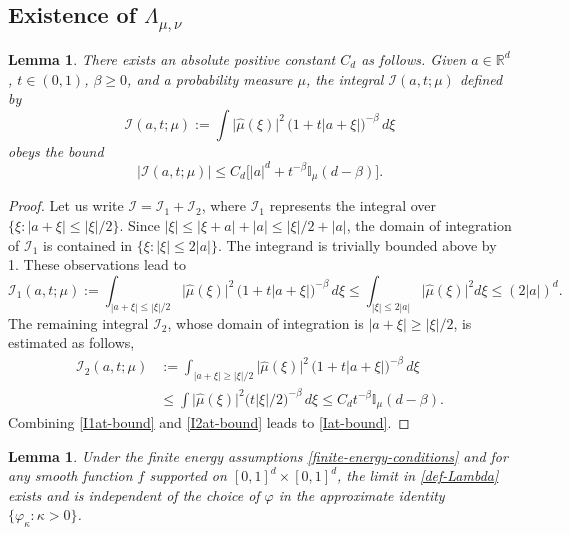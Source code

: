 \documentclass[a4paper,11pt]{amsart}
\newtheorem{lem}[thm]{\bf Lemma}
\numberwithin{equation}{section}
\begin{document}
\subsection{Existence of $\Lambda_{\mu, \nu}$} 
\begin{lem} \label{Iatmu-lemma}
There exists an absolute positive constant $C_d$ as follows. Given $a \in \mathbb R^d$, $t \in (0,1)$, $\beta \geq 0$, and a probability measure $\mu$, the integral $\mathscr{I}(a, t; \mu)$ defined by 
\begin{equation} 
\mathscr{I}(a, t; \mu) := \int \bigl| \widehat{\mu}(\xi) \bigr|^2 \, \bigl( 1 + t |a + \xi|\bigr)^{-\beta} \, d\xi \label{def-Iatmu} 
\end{equation} 
obeys the bound 
\begin{equation} \label{Iat-bound} 
\bigl| \mathscr{I}(a, t; \mu) \bigr| \leq C_d \bigl[|a|^d + t^{-\beta}\mathbb I_{\mu}(d-{\beta}) \bigr].
\end{equation} 
\end{lem} 
\begin{proof} 
Let us write $\mathscr{I} = \mathscr{I}_1 + \mathscr{I}_2$, where $\mathscr{I}_1$ represents the integral over $\{\xi: |a + \xi| \leq |\xi|/2\}$. Since $|\xi| \leq |\xi + a| + |a| \leq |\xi|/2 + |a|$,  the domain of integration of $\mathscr{I}_1$ is contained in $\{\xi: |\xi| \leq 2|a|\}$. The integrand is trivially bounded above by 1. These observations lead to 
\begin{equation} \label{I1at-bound} 
\mathscr{I}_1(a, t; \mu) := \int_{|a + \xi| \leq |\xi|/2} \bigl| \widehat{\mu}(\xi) \bigr|^2 \, \bigl( 1 + t |a + \xi|\bigr)^{-\beta} \, d\xi \leq \int_{|\xi| \leq 2 |a|} \bigl| \widehat{\mu}(\xi) \bigr|^2 d\xi \leq  (2 |a|)^d. 
\end{equation}  
The remaining integral $\mathscr{I}_2$, whose domain of integration is $|a + \xi| \geq |\xi|/2$, is estimated as follows, 
\begin{align}
\mathscr{I}_{2}(a, t;\mu) &:= \int_{|a + \xi| \geq |\xi|/2}  \bigl| \widehat{\mu}(\xi) \bigr|^2 \, \bigl( 1 + t |a + \xi|\bigr)^{-\beta} \, d\xi \nonumber \\ 
&\leq \int \bigl| \widehat{\mu}(\xi) \bigr|^2 \bigl(t|\xi|/2\bigr)^{-\beta} \, d\xi \leq C_d t^{-\beta} \mathbb I_{\mu}(d - \beta). \label{I2at-bound} 
\end{align} 
Combining \eqref{I1at-bound} and \eqref{I2at-bound} leads to \eqref{Iat-bound}.
\end{proof} 
\begin{lem} \label{limit-lemma}
Under the finite energy assumptions \eqref{finite-energy-conditions} and for any smooth function $f$  supported on $[0,1]^d \times [0,1]^d$, the limit in \eqref{def-Lambda} exists and is independent of the choice of $\varphi$ in the approximate identity $\bigl\{\varphi_{\kappa}: \kappa > 0 \bigr\}$.
\end{lem}
\end{document}
